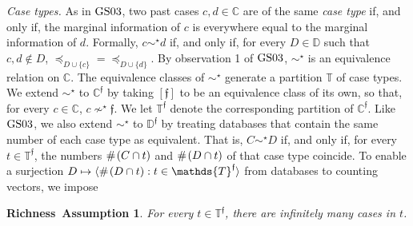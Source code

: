 \documentclass[ecta,nameyear,draft]{econsocart}
\newcommand{\countof}{\mathbin{\#}\hskip1pt}
\newcommand{\novel}{\mathfrak f}
\newcommand{\preceqb}{\mathbin{\preceq}}
\newcommand{\mbbd}{{\mathds D}}
\newcommand{\mbbdp}{{\mathds D^{\novel}}}
\newcommand{\mbbc}{{\mathds C}}
\newcommand{\mbbcp}{{\mathds C^{\novel}}}
\newcommand{\mbbt}{{\mathds {T}}}
\newcommand{\mbbtp}{{\mathds{T}^\novel}}
\newcommand{\gsii}{$\textup{GS03}$}
\theoremstyle{plain}
\newtheorem*{assumption*}{Richness~Assumption}
\theoremstyle{remark}
\begin{document}



\emph{Case types.} As in \gsii, two past cases $c , d \in \mbbc$ are of the
same \emph{case type} if, and only if, the marginal information of
$c$ is everywhere equal to the marginal information of $d$. Formally, $c \sim
^{\star} d$ if, and only if, for every $D \in \mbbd$ such that $c , d \notin
D$, $\preceqb _ {D \cup \{c \}} = \preceqb _ {D \cup \{d \}}$.  By
observation 1 of \gsii, $\sim^{\star}$ is an equivalence relation on
$\mbbc$. The equivalence classes of $\sim^\star$ generate a partition $\mbbt$
of case types.  We extend $\sim^{\star}$ to $\mbbcp$ by taking $[ \novel ]$ to
be an equivalence class of its own, so that, for every $c \in \mbbc$, $c
\nsim^{ \star} \novel$.  We let $\mbbtp$ denote the corresponding partition of
$\mbbcp$.  Like \gsii, we also extend $\sim^{\star}$ to $\mbbdp$ by treating
databases that contain the same number of each case type as equivalent. That
is, $C \sim^{\star} D$ if, and only if, for every $t \in \mbbtp$, the numbers
$\countof (C \cap t)$ and $\countof (D \cap t)$ of that case type coincide. To
enable a surjection $D \mapsto \langle\countof (D \cap t): t \in \mbbtp
\rangle$ from databases to counting vectors, we impose
\begin{assumption*}
  For every  $t \in \mbbtp$, there are infinitely many cases in $t$.
\end{assumption*}

\end{document}
